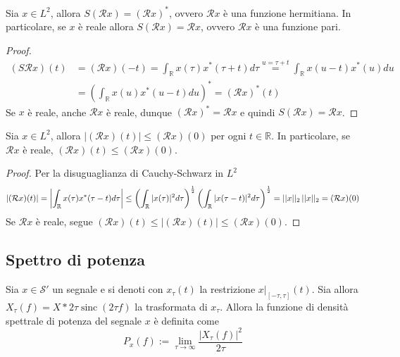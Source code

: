         \begin{property}[Simmetria]
            Sia $x \in L^2$, allora $S(\mathcal{R}x) = (\mathcal{R}x)^*$, ovvero $\mathcal{R}x$ è una funzione hermitiana.
            In particolare, se $x$ è reale allora $S(\mathcal{R}x) = \mathcal{R}x$, ovvero $\mathcal{R}x$ è una funzione pari.
        \end{property}
        \begin{proof}
            \begin{align*}
                (S\mathcal{R}x)(t) &= (\mathcal{R}x)(-t) = \int_{\mathbb{R}} x(\tau) x^*(\tau + t) d\tau
                \overset{u = \tau + t}{=} \int_{\mathbb{R}} x(u - t) x^*(u) du \\
                &= \left( \int_{\mathbb{R}} x(u) x^*(u - t) du \right)^*
                = (\mathcal{R}x)^*(t)
            \end{align*}
            Se $x$ è reale, anche $\mathcal{R}x$ è reale, dunque $(\mathcal{R}x)^* = \mathcal{R}x$ e quindi $S(\mathcal{R}x) = \mathcal{R}x$.
        \end{proof}

        \begin{property}
            Sia $x \in L^2$, allora $|(\mathcal{R}x)(t)| \leq (\mathcal{R}x)(0)$ per ogni $t \in \mathbb{R}$.
            In particolare, se $\mathcal{R}x$ è reale, $(\mathcal{R}x)(t) \leq (\mathcal{R}x)(0)$.
        \end{property}
        \begin{proof}
            Per la disuguaglianza di Cauchy-Schwarz in $L^2$
            \[
                |(\mathcal{R}x)(t)| = \left| \int_{\mathbb{R}} x(\tau) x^*(\tau - t) d\tau \right|
                \leq \qty( \int_{\mathbb{R}} |x(\tau)|^2 d\tau )^{\frac{1}{2}} \qty( \int_{\mathbb{R}} |x(\tau - t)|^2 d\tau )^{\frac{1}{2}}
                = ||x||_2 \, ||x||_2 = (\mathcal{R}x)(0)
            \]
            Se $\mathcal{R}x$ è reale, segue $(\mathcal{R}x)(t) \leq |(\mathcal{R}x)(t)| \leq (\mathcal{R}x)(0)$.
        \end{proof}
    

    \subsection{Spettro di potenza}
        \begin{definition}
            Sia $x \in \mathcal{S}'$ un segnale e si denoti con $x_{\tau}(t)$ la restrizione $x|_{[-\tau, \tau]}(t)$.
            Sia allora $X_{\tau}(f) = X * 2\tau \operatorname{sinc}(2\tau f)$ la trasformata di $x_{\tau}$.
            Allora la funzione di densità spettrale di potenza del segnale $x$ è definita come
            \[
                P_{x}(f) := \lim_{\tau \rightarrow \infty} \frac{|X_{\tau}(f)|^2}{2 \tau}
            \]
        \end{definition}

